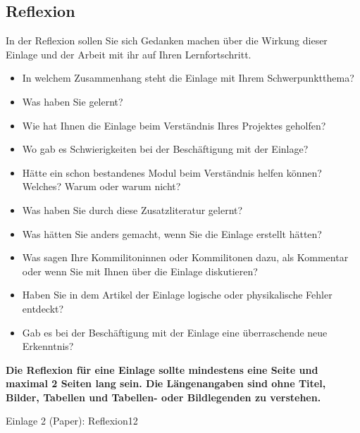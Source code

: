 \subsection{Reflexion}
\begin{hinweise}
In der Reflexion sollen Sie sich Gedanken machen über die Wirkung dieser Einlage und der Arbeit mit ihr auf
Ihren Lernfortschritt.
\begin{itemize}\itemsep0pt
\item In welchem Zusammenhang steht die Einlage mit Ihrem Schwerpunktthema?
\item Was haben Sie gelernt?
\item Wie hat Ihnen die Einlage beim Verständnis Ihres Projektes geholfen?
\item Wo gab es Schwierigkeiten bei der Beschäftigung mit der Einlage?
\item Hätte ein schon bestandenes Modul beim Verständnis helfen können? Welches? Warum oder warum nicht?
\item Was haben Sie durch diese Zusatzliteratur gelernt?
\item Was hätten Sie anders gemacht, wenn Sie die Einlage erstellt hätten?
\item Was sagen Ihre Kommilitoninnen oder Kommilitonen dazu, als Kommentar oder wenn Sie mit Ihnen über die Einlage diskutieren?
\item Haben Sie in dem Artikel der Einlage logische oder physikalische Fehler entdeckt?
\item Gab es bei der Beschäftigung mit der Einlage eine überraschende neue Erkenntnis?
\end{itemize}
\textbf{Die Reflexion für eine Einlage sollte mindestens eine Seite und maximal 2 Seiten lang sein. Die
Längenangaben sind ohne Titel, Bilder, Tabellen und Tabellen- oder Bildlegenden zu verstehen.}
\end{hinweise}
\begin{umfang}{Einlage 2 (Paper): Reflexion}{1}{2}
\end{umfang}

